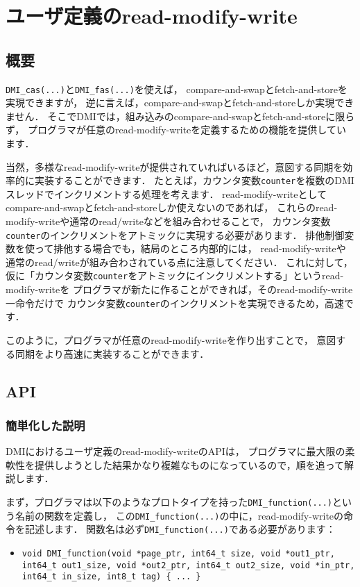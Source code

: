 \documentclass[report,12pt]{jsbook}
\begin{document}
\section{ユーザ定義のread-modify-write}

\subsection{概要}

\texttt{DMI\_cas(...)}と\texttt{DMI\_fas(...)}を使えば，
compare-and-swapとfetch-and-storeを実現できますが，
逆に言えば，compare-and-swapとfetch-and-storeしか実現できません．
そこでDMIでは，組み込みのcompare-and-swapとfetch-and-storeに限らず，
プログラマが任意のread-modify-writeを定義するための機能を提供しています．

当然，多様なread-modify-writeが提供されていればいるほど，意図する同期を効率的に実装することができます．
たとえば，カウンタ変数\texttt{counter}を複数のDMIスレッドでインクリメントする処理を考えます．
read-modify-writeとしてcompare-and-swapとfetch-and-storeしか使えないのであれば，
これらのread-modify-writeや通常のread/writeなどを組み合わせることで，
カウンタ変数\texttt{counter}のインクリメントをアトミックに実現する必要があります．
排他制御変数を使って排他する場合でも，結局のところ内部的には，
read-modify-writeや通常のread/writeが組み合わされている点に注意してください．
これに対して，仮に「カウンタ変数\texttt{counter}をアトミックにインクリメントする」というread-modify-writeを
プログラマが新たに作ることができれば，そのread-modify-write一命令だけで
カウンタ変数\texttt{counter}のインクリメントを実現できるため，高速です．

このように，プログラマが任意のread-modify-writeを作り出すことで，
意図する同期をより高速に実装することができます．

\subsection{API}

\subsubsection{簡単化した説明}

DMIにおけるユーザ定義のread-modify-writeのAPIは，
プログラマに最大限の柔軟性を提供しようとした結果かなり複雑なものになっているので，順を追って解説します．

まず，プログラマは以下のようなプロトタイプを持った\texttt{DMI\_function(...)}という名前の関数を定義し，
この\texttt{DMI\_function(...)}の中に，read-modify-writeの命令を記述します．
関数名は必ず\texttt{DMI\_function(...)}である必要があります：
\begin{itemize}
\item \texttt{void DMI\_function(void *page\_ptr, int64\_t size, void *out1\_ptr, int64\_t out1\_size, void *out2\_ptr, int64\_t out2\_size, void *in\_ptr, int64\_t in\_size, int8\_t tag) \{ ... \} }
\end{itemize}
\end{document}
